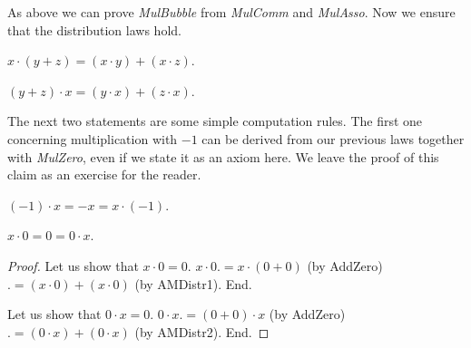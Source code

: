 \documentclass{article}
\begin{document}
  As above we can prove \textit{MulBubble} from \textit{MulComm} and \textit{MulAsso}. Now we ensure that the distribution laws hold.

  \begin{forthel}
    \begin{axiom}[AMDistr1]
      $x \cdot (y + z) = (x \cdot y) + (x \cdot z)$.
    \end{axiom}

    \begin{axiom}[AMDistr2]
      $(y + z) \cdot x = (y \cdot x) + (z \cdot x)$.
    \end{axiom}
  \end{forthel}

  The next two statements are some simple computation rules. The first one concerning multiplication with $-1$ can be derived from our previous laws together with \textit{MulZero}, even if we state it as an axiom here. We leave the proof of this claim as an exercise for the reader.

  \begin{comment}
    $$x + ((-1) \cdot x)
    = (1 \cdot x) + ((-1) \cdot x)
    = (1 + (-1)) \cdot x
    = 0 \cdot x
    = 0$$

    $$\implies (-x) + (x + ((-1) \cdot x)) = (-x) + 0$$
    $$\implies ((-x) + x) + ((-1) \cdot x) = -x$$
    $$\implies 0 + ((-1) \cdot x) = -x$$
    $$\implies ((-1) \cdot x) = -x$$

    $$(x \cdot (-1)) + x
    = (x \cdot (-1)) \cdot (x \cdot 1)
    = x \cdot ((-1) + 1)
    = x \cdot 0
    = 0$$

    $$\implies ((x \cdot (-1)) + x) - x = 0 - x$$
    $$\implies (x \cdot (-1)) + (x - x) = -x$$
    $$\implies (x \cdot (-1)) + 0 = -x$$
    $$\implies (x \cdot (-1)) = -x$$
  \end{comment}

  \begin{forthel}
    \begin{axiom}[MulMnOne]
      $(-1) \cdot x = -x = x \cdot (-1)$.
    \end{axiom}

    \begin{lemma}[MulZero]
      $x \cdot 0 = 0 = 0 \cdot x$.
    \end{lemma}
    \begin{proof}
      Let us show that $x \cdot 0 = 0$.
        $x \cdot 0 .= x \cdot (0 + 0)$ (by AddZero) $.= (x \cdot 0) + (x \cdot 0)$ (by AMDistr1).
      End.

      Let us show that $0 \cdot x = 0$.
        $0 \cdot x .= (0 + 0) \cdot x$ (by AddZero) $.= (0 \cdot x) + (0 \cdot x)$ (by AMDistr2).
      End.
    \end{proof}
  \end{forthel}
\end{document}
